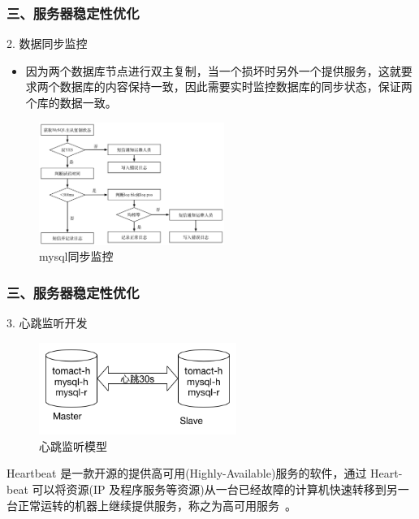 \documentclass{beamer}
\begin{document}
\begin{frame}
\frametitle{三、服务器稳定性优化}
  \begin{block}{2. 数据同步监控}
    \begin{itemize}
      \item \footnotesize{因为两个数据库节点进行双主复制，当一个损坏时另外一个提供服务，这就要求两个数据库的内容保持一致，因此需要实时监控数据库的同步状态，保证两个库的数据一致。}
    \end{itemize}
  \end{block}
  \begin{figure}
  \centering
    \includegraphics[height=4cm]{./img/03/mysql2.png}
    \caption{mysql同步监控}
    \label{fig:mysql2}
  \end{figure}
\end{frame}
\begin{frame}
\frametitle{三、服务器稳定性优化}
  \begin{block}{3. 心跳监听开发}
    \begin{figure}
    \centering
      \includegraphics[height=3cm]{./img/03/ha.png}
      \caption{心跳监听模型}
      \label{fig:mysql2}
    \end{figure}
    Heartbeat 是一款开源的提供高可用(Highly-Available)服务的软件，通过 Heart- beat 可以将资源(IP 及程序服务等资源)从一台已经故障的计算机快速转移到另一 台正常运转的机器上继续提供服务，称之为高可用服务~\cite{郭绪晶2012服务器集群系统高可用模块设计与实现}。
  \end{block}
\end{frame}
\end{document}
